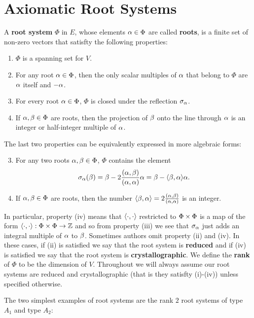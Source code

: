\documentclass[12pt,reqno,oneside]{amsart}
\begin{document}
\section*{Axiomatic Root Systems}
     A \textbf{root system} $\Phi$ in $E$, whose elements $\alpha \in \Phi$ are called \textbf{roots}, is a finite set of non-zero vectors that satisfty the following properties:

    \begin{enumerate}[label=(\roman*)]
        \item $\Phi$ is a spanning set for $V$.
        \item For any root $\alpha \in \Phi$, then the only scalar multiples of $\alpha$ that belong to $\Phi$ are $\alpha$ itself and $-\alpha$.
        \item For every root $\alpha \in \Phi$, $\Phi$ is closed under the reflection $\sigma_{\alpha}$.
        \item If $\alpha,\beta \in \Phi$ are roots, then the projection of $\beta$ onto the line through $\alpha$ is an integer or half-integer multiple of $\alpha$.
    \end{enumerate}

    The last two properties can be equivalently expressed in more algebraic forms:

    \begin{enumerate}[label=(\roman*)]
        \setcounter{enumi}{2}
        \item For any two roots $\alpha,\beta \in \Phi$, $\Phi$ contains the element
        \[
            \sigma_{\alpha}(\beta) = \beta-2\frac{(\alpha,\beta)}{(\alpha,\alpha)}\alpha = \beta-\langle\beta,\alpha\rangle\alpha.
        \]
        \item If $\alpha,\beta \in \Phi$ are roots, then the number $\langle\beta,\alpha\rangle = 2\frac{(\alpha,\beta)}{(\alpha,\alpha)}$ is an integer.
    \end{enumerate}
    
    In particular, property (iv) means that $\langle\cdot,\cdot\rangle$ restricted to $\Phi \times \Phi$ is a map of the form $\langle\cdot,\cdot\rangle:\Phi \times \Phi \to \mathbb{Z}$ and so from property (iii) we see that $\sigma_{\alpha}$ just adds an integral multiple of $\alpha$ to $\beta$. Sometimes authors omit property (ii) and (iv). In these cases, if (ii) is satisfied we say that the root system is \textbf{reduced} and if (iv) is satisfied we say that the root system is \textbf{crystallographic}. We define the \textbf{rank} of $\Phi$ to be the dimension of $V$. Throughout we will always assume our root systems are reduced and crystallographic (that is they satisfty (i)-(iv)) unless specified otherwise.

    The two simplest examples of root systems are the rank $2$ root systems of type $A_{1}$ and type $A_{2}$:
\end{document}
